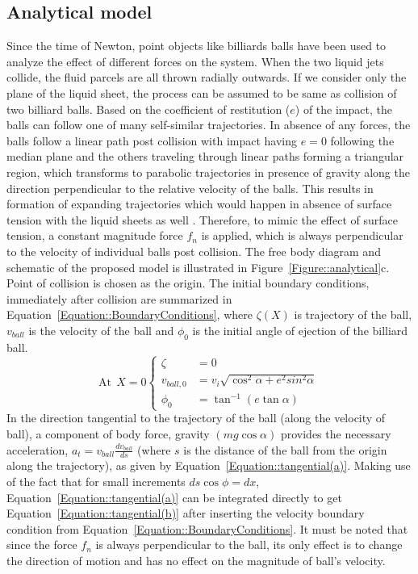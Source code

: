 \documentclass[%
aip,
sd,%
amsmath,amssymb,
preprint,%
author-year,%
]{revtex4-1}
\begin{document}
\subsection{Analytical model}
Since the time of Newton, point objects like billiards balls have been used to analyze the effect of different forces on the system. When the two liquid jets collide, the fluid parcels are all thrown radially outwards. If we consider only the plane of the liquid sheet, the process can be assumed to be same as collision of two billiard balls. Based on the coefficient of restitution ($e$) of the impact, the balls can follow one of many self-similar trajectories. In absence of any forces, the balls follow a linear path post collision with impact having $e = 0$ following the median plane and the others traveling through linear paths forming a triangular region, which transforms to parabolic trajectories in presence of gravity along the direction perpendicular to the relative velocity of the balls. This results in formation of expanding trajectories which would happen in absence of surface tension with the liquid sheets as well \citep{taylor1960formation}. Therefore, to mimic the effect of surface tension, a constant magnitude force $f_n$ is applied, which is always perpendicular to the velocity of individual balls post collision. The free body diagram and schematic of the proposed model is illustrated in Figure~\ref{Figure::analytical}c. Point of collision is chosen as the origin. The initial boundary conditions, immediately after collision are summarized in Equation~\ref{Equation::BoundaryConditions}, where $\zeta(X)$ is trajectory of the ball, $v_{ball}$ is the velocity of the ball and $\phi_0$ is the initial angle of ejection of the billiard ball. 
\begin{equation}\label{Equation::BoundaryConditions}
\text{At} \: \: X = 0 \left \{
\begin{aligned}
	\zeta &= 0 \\
	v_{ball,0} &= v_i\sqrt{\cos^2\alpha + e^2sin^2\alpha} \\
	\phi_0 &= \tan^{-1}\left(e\tan\alpha\right)
\end{aligned} \right.
\end{equation} 
In the direction tangential to the trajectory of the ball (along the velocity of ball), a component of body force, gravity $\left( mg\cos\alpha \right)$ provides the necessary acceleration, $a_t = v_{ball}\frac{dv_{ball}}{ds}$ (where $s$ is the distance of the ball from the origin along the trajectory), as given by Equation~\ref{Equation::tangential(a)}. Making use of the fact that for small increments $ds\cos\phi = dx$, Equation~\ref{Equation::tangential(a)} can be integrated directly to get Equation~\ref{Equation::tangential(b)} after inserting the velocity boundary condition from Equation~\ref{Equation::BoundaryConditions}. It must be noted that since the force $f_n$ is always perpendicular to the ball, its only effect is to change the direction of motion and has no effect on the magnitude of ball's velocity.
\end{document}
